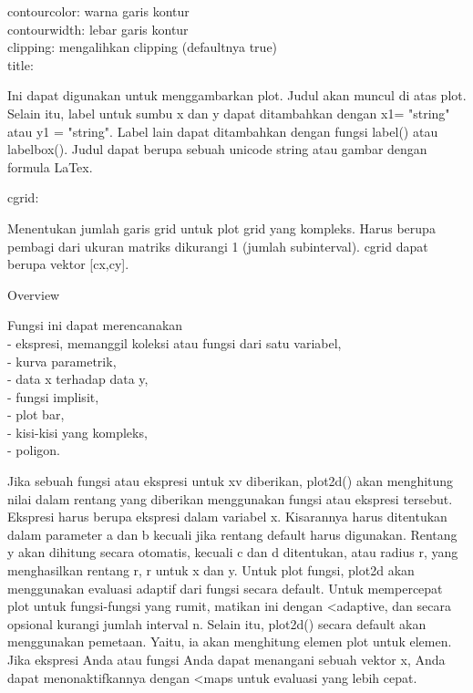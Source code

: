 \documentclass[a4paper,10pt]{article}
\begin{document}
\begin{eulernotebook}
\begin{eulercomment}
\begin{eulercomment}
\begin{eulercomment}
contourcolor: warna garis kontur\\
contourwidth: lebar garis kontur\\
clipping: mengalihkan clipping (defaultnya true)\\
title:\\
\end{eulercomment}
\begin{eulerttcomment}
  Ini dapat digunakan untuk menggambarkan plot. Judul akan muncul di
  atas plot. Selain itu, label untuk sumbu x dan y dapat ditambahkan
  dengan x1= "string" atau y1 = "string". Label lain dapat ditambahkan
  dengan fungsi label() atau labelbox(). Judul dapat berupa sebuah
  unicode string atau gambar dengan formula LaTex.
\end{eulerttcomment}
\begin{eulercomment}
cgrid:\\
\end{eulercomment}
\begin{eulerttcomment}
  Menentukan jumlah garis grid untuk plot grid yang kompleks. Harus
  berupa pembagi dari ukuran matriks dikurangi 1 (jumlah subinterval).
  cgrid dapat berupa vektor [cx,cy].
\end{eulerttcomment}
\begin{eulercomment}

Overview

Fungsi ini dapat merencanakan\\
- ekspresi, memanggil koleksi atau fungsi dari satu variabel,\\
- kurva parametrik,\\
- data x terhadap data y,\\
- fungsi implisit,\\
- plot bar,\\
- kisi-kisi yang kompleks,\\
- poligon.

Jika sebuah fungsi atau ekspresi untuk xv diberikan, plot2d() akan
menghitung nilai dalam rentang yang diberikan menggunakan fungsi atau
ekspresi tersebut. Ekspresi harus berupa ekspresi dalam variabel x.
Kisarannya harus ditentukan dalam parameter a dan b kecuali jika
rentang default harus digunakan. Rentang y akan dihitung secara
otomatis, kecuali c dan d ditentukan, atau radius r, yang menghasilkan
rentang r, r untuk x dan y. Untuk plot fungsi, plot2d akan menggunakan
evaluasi adaptif dari fungsi secara default. Untuk mempercepat plot
untuk fungsi-fungsi yang rumit, matikan ini dengan \textless{}adaptive, dan
secara opsional kurangi jumlah interval n. Selain itu, plot2d() secara
default akan menggunakan pemetaan. Yaitu, ia akan menghitung elemen
plot untuk elemen. Jika ekspresi Anda atau fungsi Anda dapat menangani
sebuah vektor x, Anda dapat menonaktifkannya dengan \textless{}maps untuk
evaluasi yang lebih cepat.


\end{eulercomment}
\end{eulercomment}
\end{eulercomment}
\end{eulernotebook}
\end{document}
